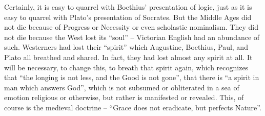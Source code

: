 Certainly, it is easy to quarrel with Boethius' presentation of logic, just as it is easy to quarrel with Plato's presentation of Socrates. But the Middle Ages did not die because of Progress or Necessity or even scholastic nominalism. They did not die because the West lost its ``soul'' -- Victorian English had an abundance of such. Westerners had lost their ``spirit'' which Augustine, Boethius, Paul, and Plato all breathed and shared. In fact, they had lost almost any spirit at all. It will be necessary, to change this, to breath that spirit again, which recognizes that ``the longing is not less, and the Good is not gone'', that there is ``a spirit in man which answers God'', which is not subsumed or obliterated in a sea of emotion religious or otherwise, but rather is manifested or revealed. This, of course is the medieval doctrine -- ``Grace does not eradicate, but perfects Nature''.


